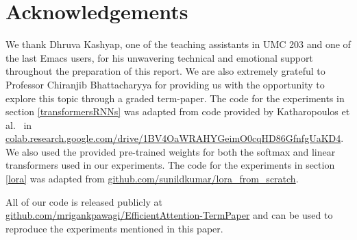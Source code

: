\documentclass{article}
\begin{document}
\section{Acknowledgements}
We thank Dhruva Kashyap, one of the teaching assistants in UMC 203 and one of the last Emacs users, for his unwavering technical and emotional support throughout the preparation of this report. We are also extremely grateful to Professor Chiranjib Bhattacharyya for providing us with the opportunity to explore this topic through a graded term-paper. The code for the experiments in section \ref{transformersRNNs} was adapted from code provided by Katharopoulos et al.~\cite{transformersRNN} in \hyperlink{https://colab.research.google.com/drive/1BV4OaWRAHYGeimO0cqHD86GfnfgUaKD4}{colab.research.google.com/drive/1BV4OaWRAHYGeimO0cqHD86GfnfgUaKD4}. We also used the provided pre-trained weights for both the softmax and linear transformers used in our experiments. The code for the experiments in section \ref{lora} was adapted from \hyperlink{https://github.com/sunildkumar/lora_from_scratch/blob/main/lora_on_mnist.ipynb}{github.com/sunildkumar/lora\_from\_scratch}.

All of our code is released publicly at \hyperlink{https://github.com/mrigankpawagi/EfficientAttention-TermPaper}{github.com/mrigankpawagi/EfficientAttention-TermPaper} and can be used to reproduce the experiments mentioned in this paper.

\end{document}
